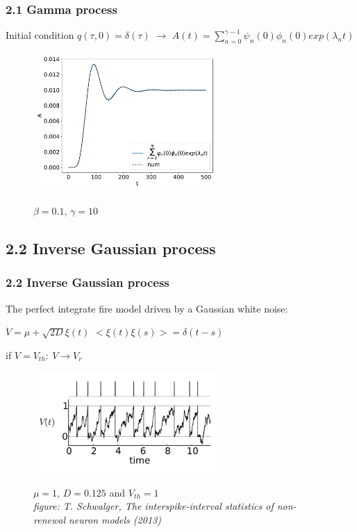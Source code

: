 \documentclass{beamer}
\begin{document}
\begin{frame}

\frametitle{2.1 Gamma process}
\small{Initial condition $q(\tau,0)=\delta(\tau)$ $\rightarrow$ $A(t)=\sum_{n=0}^{\gamma-1}\psi_n(0)\phi_n(0)exp(\lambda_nt)$}
\begin{figure}
		\centering
	
	\includegraphics[width=70mm]{sum10gamma.pdf}


$\beta=0.1$, $\gamma=10$
\end{figure}


\end{frame}



\subsection{2.2 Inverse Gaussian process}

\begin{frame}
\frametitle{2.2 Inverse Gaussian process}
The perfect integrate fire model driven by a Gaussian white noise:

\vspace{0.3cm}
$\dot V=\mu +\sqrt{2D}\xi(t)$ \hspace{1cm} $<\xi(t)\xi(s)>=\delta(t-s)$

\vspace{0.2cm}
if $V=V_{th}:\:V\rightarrow V_r$

\begin{figure}
	\centering
	
	\includegraphics[width=70mm]{tilo}
	
	
	\small{$\mu=1$, $D=0.125$ and $V_{th}=1$}\\
	\tiny{
		\textit{figure: T. Schwalger, The interspike-interval statistics of non-renewal neuron models (2013) }}
	
\end{figure}

\end{frame}
\end{document}
